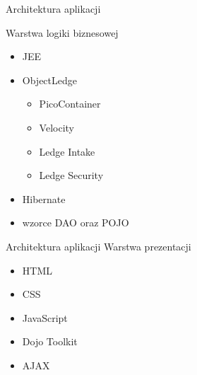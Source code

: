 \documentclass[10pt,utf8]{beamer}
\begin{document}
\begin{frame}{Architektura aplikacji}

Warstwa logiki biznesowej
		\begin{itemize}
			\item JEE
			\item ObjectLedge
			\begin{itemize}
				\item PicoContainer
				\item Velocity
				\item Ledge Intake
				\item Ledge Security
			\end{itemize}
			\item Hibernate
			\item wzorce DAO oraz POJO
		\end{itemize}
\end{frame}

\begin{frame}{Architektura aplikacji}
	Warstwa prezentacji
	\begin{itemize}
		\item HTML
		\item CSS
		\item JavaScript
		\item Dojo Toolkit
		\item AJAX
	\end{itemize}

\end{frame}

\end{document}
